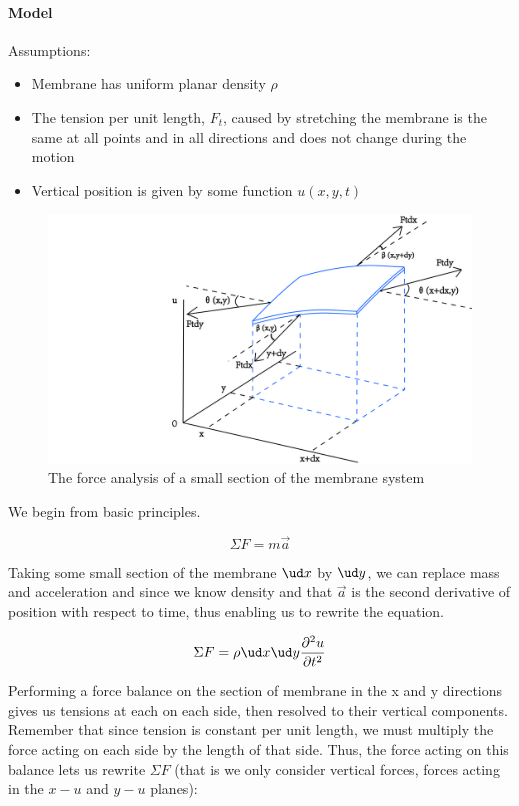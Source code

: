 {\paragraph{Model}
Assumptions:
\begin{itemize}
	\item Membrane has uniform planar density $\rho$
    \item The tension per unit length, $F_t$, caused by stretching the membrane is the same at all points and in all directions and does not change during the motion
    \item Vertical position is given by some function $u(x,y,t)$
\end{itemize}
\begin{figure}[htb]
	\centering
	\includegraphics[width=15cm]{Figures/2D_waves_model.png}       
	\caption{The force analysis of a small section of the membrane system }
	\label{2D_waves_model.fig}
\end{figure}
We begin from basic principles.

$$\Sigma F = m\vec{a}$$

\noindent Taking some small section of the membrane $\ud x$ by $\ud y$, we can replace mass and acceleration and since we know density and that $\vec{a}$ is the second derivative of position with respect to time, thus enabling us to rewrite the equation.

\begin{equation}
\label{no_balance}
\Sigma F = \rho \ud x\ud y \frac{\partial^2u}{\partial t^2}
\end{equation}

\noindent Performing a force balance on the section of membrane in the x and y directions gives us tensions at each on each side, then resolved to their vertical components. Remember that since tension is constant per unit length, we must multiply the force acting on each side by the length of that side. Thus, the force acting on this balance lets us rewrite $\Sigma F$ (that is we only consider vertical forces, forces acting in the $x-u$ and $y-u$ planes): 

}
